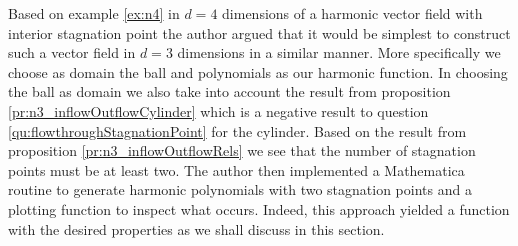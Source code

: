Based on example \ref{ex:n4} in $d=4$ dimensions of a harmonic vector field with interior stagnation point
the author argued that it would be simplest to construct such a vector field in $d=3$ dimensions in a similar manner.
More specifically we choose as domain the ball and polynomials as our harmonic function. 
In choosing the ball as domain we also take into account the result from proposition \ref{pr:n3_inflowOutflowCylinder}
which is a negative result to question \ref{qu:flowthroughStagnationPoint} for the cylinder.
Based on the result from proposition \ref{pr:n3_inflowOutflowRels} we see that the number of stagnation
points must be at least two.
The author then implemented a Mathematica routine to generate harmonic polynomials
with two stagnation points and a plotting function to inspect what occurs.
Indeed, this approach yielded a function with the desired properties as
we shall discuss in this section.
